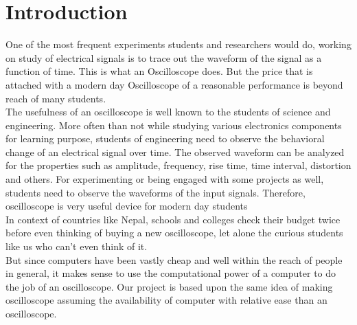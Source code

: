 \documentclass[12pt,a4paper]{article}
\author{Prakash Gautam}
\begin{document}
\begin{titlepage}
	
\end{titlepage}

\vfill

\vfill
\newpage


\newpage

\newpage
\tableofcontents

\newpage
\listoffigures

\listoftables
\newpage



\section{Introduction}
One of the most frequent experiments students and researchers would do, working on study of electrical signals is to trace out the waveform of the signal as a function of time. This is what an Oscilloscope does. But the price that is attached with a modern day Oscilloscope of a reasonable performance is beyond reach of many students. \\

The usefulness of an oscilloscope is well known to the students of science and engineering. More often than not while studying various electronics components for learning purpose, students of engineering need to observe the behavioral change of an electrical signal over time. The observed waveform can be analyzed for the properties such as amplitude, frequency, rise time, time interval, distortion and others. For experimenting or being engaged with some projects as well, students need to observe the waveforms of the input signals. Therefore, oscilloscope is very useful device for modern day students \\

In context of countries like Nepal, schools and colleges check their budget twice before even thinking of buying a new oscilloscope, let alone the curious students like us who can't even think of it.\\

But since computers have been vastly cheap and well within the reach of people in general, it makes sense to use the computational power of a computer to do the job of an oscilloscope. Our project is based upon the same idea of making oscilloscope assuming the availability of computer with relative ease than an oscilloscope. \\
\end{document}

